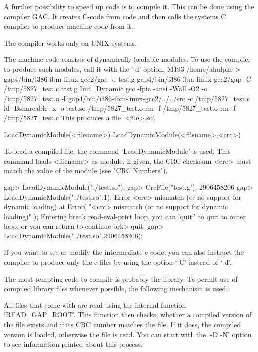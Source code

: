 A further possibility to speed up code is to compile it. This can be done
using the {\GAP} compiler {\sf GAC}. It creates C-code from {\GAP} code and
then calls the systems C compiler to produce machine code from it.

The compiler works only on UNIX systems.

The machine code consists of dynamically loadable modules.
To use the compiler to produce such modules, call it with the '-d' option.
\begintt
M193 /home/ahulpke > gap4/bin/i386-ibm-linux-gcc2/gac -d test.g
gap4/bin/i386-ibm-linux-gcc2/gap -C /tmp/5827_test.c test.g Init_Dynamic
gcc -fpic -ansi -Wall -O2 -o /tmp/5827_test.o -I
gap4/bin/i386-ibm-linux-gcc2/../../src -c /tmp/5827_test.c
ld -Bshareable -x -o test.so /tmp/5827_test.o
rm -f /tmp/5827_test.o
rm -f /tmp/5827_test.c
\endtt
This produces a file `<file>.so'.

\>LoadDynamicModule(<filename>)
\)LoadDynamicModule(<filename>,<crc>)

To load a compiled file, the command `LoadDynamicModule' is used. This
command loads <filename> as module. If given, the CRC checksum <crc> must
match the value of the module (see "CRC Numbers").

\begintt
gap> LoadDynamicModule("./test.so");
gap> CrcFile("test.g");
2906458206
gap> LoadDynamicModule("./test.so",1);
Error <crc> mismatch (or no support for dynamic loading) at
Error( "<crc> mismatch (or no support for dynamic loading)" );
Entering break read-eval-print loop, you can 'quit;' to quit to outer loop,
or you can return to continue
brk> quit;
gap> LoadDynamicModule("./test.so",2906458206);
\endtt

If you want to see or modify the intermediate c-code, you can also instruct
the compiler to produce only the c-files by using the option `-C' instead of
`-d'.


The most tempting code to compile is probably the library. To permit use of
compiled library files whenever possible, the following mechanism is used:

All files that come with {\GAP} are read using the internal function
`READ_GAP_ROOT'. This function then checks, whether a compiled version of the
file exists and if its CRC number matches the file. If it does, the compiled
version is loaded, otherwise the file is read.
You can start {\GAP} with the `-D -N' option to see information printed
about this process.

